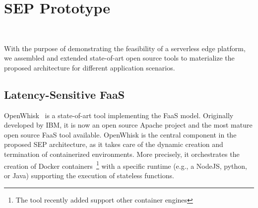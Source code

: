 \documentclass[letterpaper, 10 pt, conference]{ieeeconf}  %
\begin{document}



\section{SEP Prototype}~\label{sec:prototype}

With the purpose of demonstrating the feasibility of a serverless edge platform, we assembled and extended state-of-art open source tools to materialize the proposed architecture for different application scenarios.


\subsection{Latency-Sensitive FaaS}

OpenWhisk~\cite{OpenWhisk} is a state-of-art tool implementing the FaaS model. Originally developed by IBM, it is now an open source Apache project and the most mature open source FaaS tool available. OpenWhisk is the central component in the proposed SEP architecture, as it takes care of the dynamic creation and termination of containerized environments. More precisely, it orchestrates the creation of Docker containers~\footnote{The tool recently added support other container engines} with a specific runtime (e.g., a NodeJS, python, or Java) supporting the execution of stateless functions.
\end{document}

